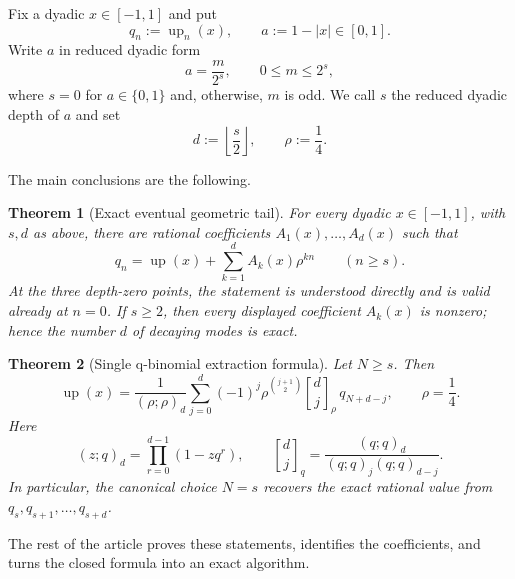 \documentclass[11pt]{article}
\newtheorem{theorem}{Theorem}[section]
\newcommand{\upf}{\operatorname{up}}
\newcommand{\qbinom}[3]{\genfrac{[}{]}{0pt}{}{#1}{#2}_{#3}}
\newcommand{\poch}[3]{\left(#1;#2\right)_{#3}}
\begin{document}
Fix a dyadic $x\in[-1,1]$ and put
\begin{equation}
 q_n:=\upf_n(x),
 \qquad
 a:=1-|x|\in[0,1].
 \label{eq:q-and-a}
\end{equation}
Write $a$ in reduced dyadic form
\begin{equation}
 a=\frac{m}{2^s},
 \qquad 0\le m\le2^s,
 \label{eq:reduced-a}
\end{equation}
where $s=0$ for $a\in\{0,1\}$ and, otherwise, $m$ is odd.  We call $s$ the
reduced dyadic depth of $a$ and set
\begin{equation}
 d:=\left\lfloor\frac{s}{2}\right\rfloor,
 \qquad \rho:=\frac14.
 \label{eq:d-and-rho}
\end{equation}

The main conclusions are the following.

\begin{theorem}[Exact eventual geometric tail]
\label{thm:main-tail}
For every dyadic $x\in[-1,1]$, with $s,d$ as above, there are rational
coefficients $A_1(x),\ldots,A_d(x)$ such that
\begin{equation}
 \boxed{
 q_n=\upf(x)+\sum_{k=1}^{d}A_k(x)\rho^{kn}
 \qquad(n\ge s).}
 \label{eq:main-tail}
\end{equation}
At the three depth-zero points, the statement is understood directly and is
valid already at $n=0$.  If $s\ge2$, then every displayed coefficient $A_k(x)$ is nonzero; hence the
number $d$ of decaying modes is exact.
\end{theorem}

\begin{theorem}[Single q-binomial extraction formula]
\label{thm:main-extraction}
Let $N\ge s$.  Then
\begin{equation}
 \boxed{
 \upf(x)=\frac{1}{\poch{\rho}{\rho}{d}}
 \sum_{j=0}^{d}(-1)^j\rho^{\binom{j+1}{2}}
 \qbinom{d}{j}{\rho}\,q_{N+d-j},
 \qquad \rho=\frac14.}
 \label{eq:main-extraction}
\end{equation}
Here
\begin{equation}
 \poch{z}{q}{d}=\prod_{r=0}^{d-1}(1-zq^r),
 \qquad
 \qbinom{d}{j}{q}
 =\frac{\poch{q}{q}{d}}
 {\poch{q}{q}{j}\poch{q}{q}{d-j}}.
 \label{eq:q-notation}
\end{equation}
In particular, the canonical choice $N=s$ recovers the exact rational value
from $q_s,q_{s+1},\ldots,q_{s+d}$.
\end{theorem}

The rest of the article proves these statements, identifies the coefficients,
and turns the closed formula into an exact algorithm.
\end{document}
